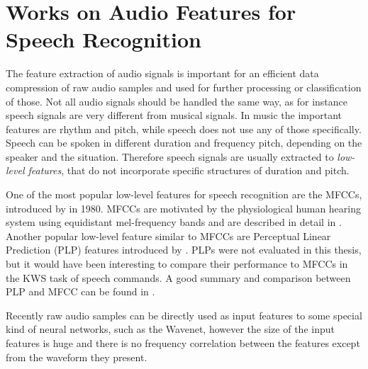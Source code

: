 
\section{Works on Audio Features for Speech Recognition}\label{sec:prev_features}
The feature extraction of audio signals is important for an efficient data compression of raw audio samples and used for further processing or classification of those.
Not all audio signals should be handled the same way, as for instance speech signals are very different from musical signals.
In music the important features are rhythm and pitch, while speech does not use any of those specifically.
Speech can be spoken in different duration and frequency pitch, depending on the speaker and the situation.
Therefore speech signals are usually extracted to \emph{low-level features}, that do not incorporate specific structures of duration and pitch.

One of the most popular low-level features for speech recognition are the MFCCs, introduced by \cite{Mermelstein1980} in 1980.
MFCCs are motivated by the physiological human hearing system using equidistant mel-frequency bands and are described in detail in .
Another popular low-level feature similar to MFCCs are Perceptual Linear Prediction (PLP) features introduced by \cite{Hermansky1987}.
PLPs were not evaluated in this thesis, but it would have been interesting to compare their performance to MFCCs in the KWS task of speech commands.
A good summary and comparison between PLP and MFCC can be found in \cite{Hoenig2005}.

Recently raw audio samples can be directly used as input features to some special kind of neural networks, such as the Wavenet, however the size of the input features is huge and there is no frequency correlation between the features except from the waveform they present.